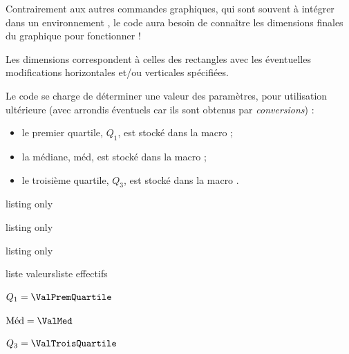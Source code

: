 \begin{cautionblock}
Contrairement aux autres commandes graphiques, qui sont souvent à intégrer dans un environnement \TikZ, le code aura besoin de connaître les dimensions finales du graphique pour fonctionner !

Les dimensions correspondent à celles des rectangles avec les éventuelles modifications horizontales et/ou verticales spécifiées.

\smallskip

Le code se charge de déterminer une valeur des paramètres, pour utilisation ultérieure (avec arrondis éventuels car ils sont obtenus par \textit{conversions}) :

\begin{itemize}
	\item le premier quartile, $Q_1$, est stocké dans la macro  ;
	\item la médiane, méd, est stocké dans la macro  ;
	\item le troisième quartile, $Q_3$, est stocké dans la macro .
\end{itemize}
\vspace*{-\baselineskip}\leavevmode
\end{cautionblock}

\begin{PresCodeTexPL}{listing only}
\end{PresCodeTexPL}

\begin{PresCodeTexPL}{listing only}
\end{PresCodeTexPL}

\begin{PresCodeTexPL}{listing only}
\begin{EnvCourbeECC}[clés]{liste valeurs}{liste effectifs}
\end{EnvCourbeECC}
\end{PresCodeTexPL}

\begin{PresCodePL}{}
$Q_1 = \ValPremQuartile$\par
$\text{Méd} = \ValMed$\par
$Q_3 = \ValTroisQuartile$\par
\end{PresCodePL}

